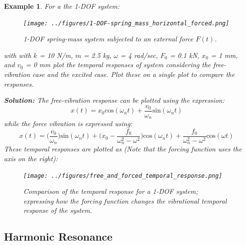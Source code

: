\documentclass[12pt,letter]{article}
\newtheorem{ex}{Example}
\numberwithin{ex}{section} %
\newenvironment{example}{\begin{mdframed}[middlelinewidth=0.5mm]\begin{ex}\normalfont}{\end{ex}\end{mdframed}}
\numberwithin{re}{section} %
\begin{document}
			\begin{example}
				For a the 1-DOF system:
				\begin{figure}[H]
					\centering
					\texttt{[image: ../figures/1-DOF-spring\_mass\_horizontal\_forced.png]}
					\caption{1-DOF spring-mass system subjected to an external force $F(t)$.}
				\end{figure}
				with with $k$ = 10 N/m, $m$ = 2.5 kg, $\omega$ = 4 rad/sec, $F_0$ = 0.1 kN, $x_0$ = 1 mm, and $v_0$ = 0 mm plot the temporal responses of system considering the free-vibration case and the excited case. Plot these on a single plot to compare the responses. 
							
				\noindent\textbf{Solution:} The free-vibration response can be plotted using the expression:
				\begin{equation}
					x(t) = x_0\text{cos}(\omega_n t) + \frac{v_0}{\omega_n}\text{sin}(\omega_n t)
				\end{equation}				
				while the force vibration is expressed using:
				\begin{equation}
					x(t) = \Big(\frac{v_0}{\omega_n}\Big)\text{sin}(\omega_n t) + \Big(x_0-\frac{f_0}{\omega_n^2-\omega^2}\Big)\text{cos}(\omega_n t) + \frac{f_0}{\omega_n^2-\omega^2}\text{cos}(\omega t)
				\end{equation}	
				These temporal responses are plotted as (Note that the forcing function uses the axis on the right):
				\begin{figure}[H]
					\centering
					\texttt{[image: ../figures/free\_and\_forced\_temporal\_response.png]}
					\caption{Comparison of the temporal response for a 1-DOF system; expressing how the forcing function changes the vibrational  temporal response of the system.}
				\end{figure}	
			\end{example}
			
			
		\subsection{Harmonic Resonance}			
			
\end{document}
